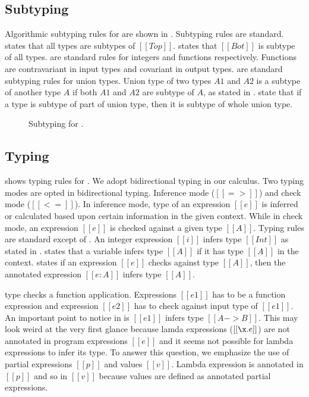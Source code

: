 \subsection{Subtyping}
\label{sec:union:sub}
Algorithmic subtyping rules for \dut are shown in . Subtyping rules are standard.
 states that all types are subtypes of $[[Top]]$.  states that $[[Bot]]$ is
subtype of all types.  are standard rules for integers and functions respectively.
Functions are contravariant in input types and covariant in output types.  are
standard subtyping rules for union types. Union type of two types $A1$ and $A2$ is a subtype of another
type $A$ if both $A1$ and $A2$ are subtype of $A$, as stated in .  state
that if a type is subtype of part of union type, then it is subtype of whole union type.

\begin{figure}[t]
  \begin{small}
    \centering
  \end{small}
  \caption{Subtyping for \dut.}
  \label{fig:union:sub}
\end{figure}

\subsection{Typing}
\label{sec:union:typ}
 shows typing rules for \dut. We adopt bidirectional typing in our calculus.
Two typing modes are opted in bidirectional typing. Inference mode ($[[=>]]$) and check mode ($[[<=]]$).
In inference mode, type of an expression $[[e]]$ is inferred or calculated based upon certain information in
the given context. While in check mode, an expression $[[e]]$ is checked against a given type $[[A]]$.
Typing rules are standard except of .
An integer expression $[[i]]$ infers type $[[Int]]$ as stated in .
 states that a variable infers type $[[A]]$ if it has type $[[A]]$ in the context.
 states if an expression $[[e]]$ checks against type $[[A]]$, then the annotated expression
$[[e:A]]$ infers type $[[A]]$. 

 type checks a function application. Expressions $[[e1]]$
has to be a function expression and expression $[[e2]]$ has to check against input type of $[[e1]]$.
An important point to notice in  is $[[e1]]$ infers type $[[A -> B]]$. This may look weird
at the very first glance because lamda expressions ($[[\x.e]]$) are not annotated in program expressions 
$[[e]]$ and it seems not possible for lambda expressions to infer its type.
To answer this question, we emphasize the use of partial expressions $[[p]]$ and values $[[v]]$.
Lambda expression is annotated in $[[p]]$ and so in $[[v]]$ because values are defined as annotated
partial expressions. 

